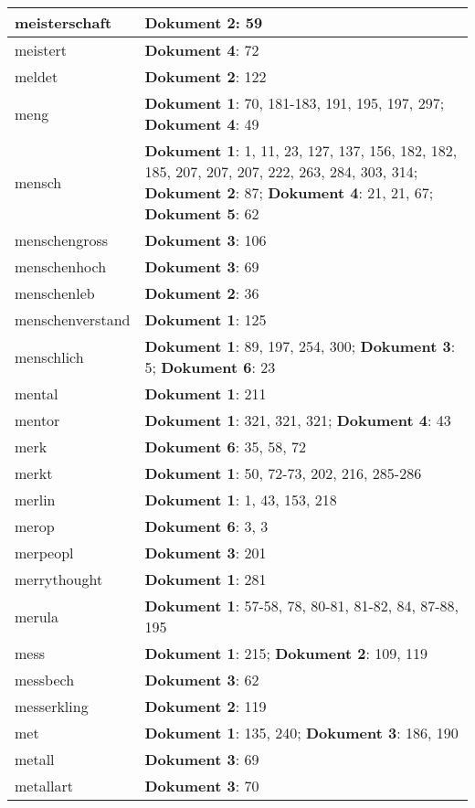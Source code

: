 \documentclass[a5paper]{article}
\begin{document}
\begin{longtable}[l]{|l|p{3in}|}
\hline
meisterschaft & \textbf{Dokument 2}: 59 \\
\hline
meistert & \textbf{Dokument 4}: 72 \\
\hline
meldet & \textbf{Dokument 2}: 122 \\
\hline
meng & \textbf{Dokument 1}: 70, 181-183, 191, 195, 197, 297; \textbf{Dokument 4}: 49 \\
\hline
mensch & \textbf{Dokument 1}: 1, 11, 23, 127, 137, 156, 182, 182, 185, 207, 207, 207, 222, 263, 284, 303, 314; \textbf{Dokument 2}: 87; \textbf{Dokument 4}: 21, 21, 67; \textbf{Dokument 5}: 62 \\
\hline
menschengross & \textbf{Dokument 3}: 106 \\
\hline
menschenhoch & \textbf{Dokument 3}: 69 \\
\hline
menschenleb & \textbf{Dokument 2}: 36 \\
\hline
menschenverstand & \textbf{Dokument 1}: 125 \\
\hline
menschlich & \textbf{Dokument 1}: 89, 197, 254, 300; \textbf{Dokument 3}: 5; \textbf{Dokument 6}: 23 \\
\hline
mental & \textbf{Dokument 1}: 211 \\
\hline
mentor & \textbf{Dokument 1}: 321, 321, 321; \textbf{Dokument 4}: 43 \\
\hline
merk & \textbf{Dokument 6}: 35, 58, 72 \\
\hline
merkt & \textbf{Dokument 1}: 50, 72-73, 202, 216, 285-286 \\
\hline
merlin & \textbf{Dokument 1}: 1, 43, 153, 218 \\
\hline
merop & \textbf{Dokument 6}: 3, 3 \\
\hline
merpeopl & \textbf{Dokument 3}: 201 \\
\hline
merrythought & \textbf{Dokument 1}: 281 \\
\hline
merula & \textbf{Dokument 1}: 57-58, 78, 80-81, 81-82, 84, 87-88, 195 \\
\hline
mess & \textbf{Dokument 1}: 215; \textbf{Dokument 2}: 109, 119 \\
\hline
messbech & \textbf{Dokument 3}: 62 \\
\hline
messerkling & \textbf{Dokument 2}: 119 \\
\hline
met & \textbf{Dokument 1}: 135, 240; \textbf{Dokument 3}: 186, 190 \\
\hline
metall & \textbf{Dokument 3}: 69 \\
\hline
metallart & \textbf{Dokument 3}: 70 \\
\hline

\end{longtable}
\end{document}
